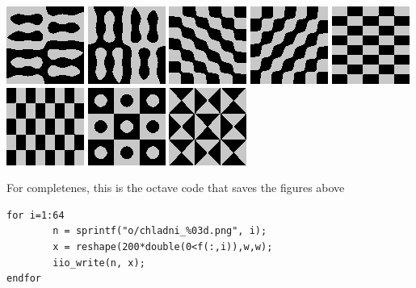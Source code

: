 \includegraphics{o/dchladni_057.png}
\includegraphics{o/dchladni_058.png}
\includegraphics{o/dchladni_059.png}
\includegraphics{o/dchladni_060.png}
\includegraphics{o/dchladni_061.png}
\includegraphics{o/dchladni_062.png}
\includegraphics{o/dchladni_063.png}
\includegraphics{o/dchladni_064.png}


For completenes, this is the octave code that saves the figures above
\begin{verbatim}
for i=1:64
        n = sprintf("o/chladni_%03d.png", i);
        x = reshape(200*double(0<f(:,i)),w,w);
        iio_write(n, x);
endfor
\end{verbatim}


